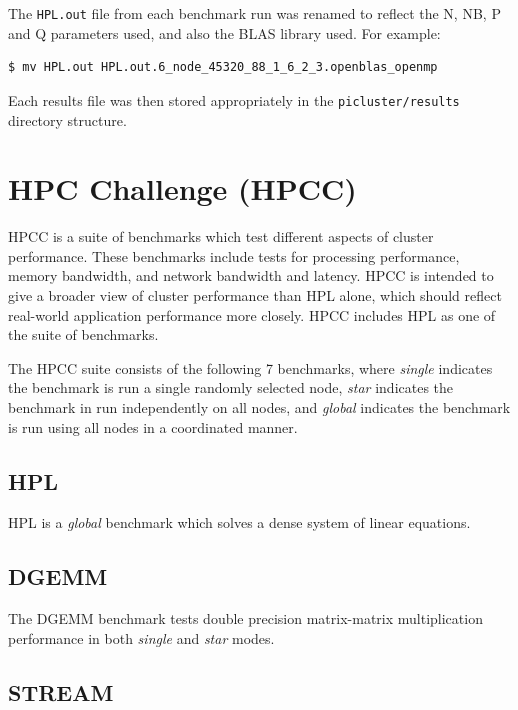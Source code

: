 \documentclass{report}
\begin{document}
The \verb|HPL.out| file from each benchmark run was renamed to reflect the N, NB, P and Q parameters used, and also the BLAS library used. For example:

\lstset{style=type}
\begin{lstlisting}
$ mv HPL.out HPL.out.6_node_45320_88_1_6_2_3.openblas_openmp
\end{lstlisting}

Each results file was then stored appropriately in the \verb|picluster/results| directory structure. 


%
%
\section{HPC Challenge (HPCC)}

HPCC is a suite of benchmarks which test different aspects of cluster performance. These benchmarks include tests for processing performance, memory bandwidth, and network bandwidth and latency. HPCC is intended to give a broader view of cluster performance than HPL alone, which should reflect real-world application performance more closely. HPCC includes HPL as one of the suite of benchmarks.

The HPCC suite consists of the following 7 benchmarks, where \emph{single} indicates the benchmark is run a single randomly selected node, \emph{star} indicates the benchmark in run independently on all nodes, and \emph{global} indicates the benchmark is run using all nodes in a coordinated manner. 


%
%
\subsection{HPL}

HPL is a \emph{global} benchmark which solves a dense system of linear equations.


%
%
\subsection{DGEMM}

The DGEMM benchmark tests double precision matrix-matrix multiplication performance in both \emph{single} and \emph{star} modes.

 
%
%
\subsection{STREAM}
\end{document}

